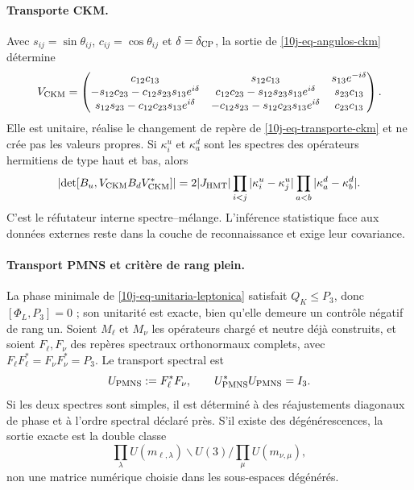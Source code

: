 \paragraph{Transporte CKM.}
Avec \(s_{ij}=\sin\theta_{ij}\), \(c_{ij}=\cos\theta_{ij}\) et \(\delta=\delta_{\rm CP}\), la sortie de \eqref{10j-eq-angulos-ckm} détermine
\begin{equation}
 V_{\rm CKM}=\begin{pmatrix}
 c_{12}c_{13}&s_{12}c_{13}&s_{13}e^{-i\delta}\\
 -s_{12}c_{23}-c_{12}s_{23}s_{13}e^{i\delta}&
 c_{12}c_{23}-s_{12}s_{23}s_{13}e^{i\delta}&s_{23}c_{13}\\
 s_{12}s_{23}-c_{12}c_{23}s_{13}e^{i\delta}&
 -c_{12}s_{23}-s_{12}c_{23}s_{13}e^{i\delta}&c_{23}c_{13}
 \end{pmatrix}.
 \label{10j-eq-vckm-explicita}
\end{equation}
Elle est unitaire, réalise le changement de repère de \eqref{10j-eq-transporte-ckm} et ne crée pas les valeurs propres. Si \(\kappa_i^u\) et \(\kappa_a^d\) sont les spectres des opérateurs hermitiens de type haut et bas, alors
\begin{equation}
 \left|\det[B_u,V_{\rm CKM}B_dV_{\rm CKM}^*]\right|
 =2|J_{\rm HMT}|
 \prod_{i<j}|\kappa_i^u-\kappa_j^u|
 \prod_{a<b}|\kappa_a^d-\kappa_b^d|.
 \label{10j-eq-determinante-conmutador-ckm}
\end{equation}
C'est le réfutateur interne spectre--mélange. L'inférence statistique face aux données externes reste dans la couche de reconnaissance et exige leur covariance.

\paragraph{Transport PMNS et critère de rang plein.}
La phase minimale de \eqref{10j-eq-unitaria-leptonica} satisfait \(Q_K\leq P_3\), donc \([\Phi_L,P_3]=0\) ; son unitarité est exacte, bien qu'elle demeure un contrôle négatif de rang un. Soient \(M_\ell\) et \(M_\nu\) les opérateurs chargé et neutre déjà construits, et soient \(F_\ell,F_\nu\) des repères spectraux orthonormaux complets, avec \(F_\ell F_\ell^*=F_\nu F_\nu^*=P_3\). Le transport spectral est
\begin{equation}
 U_{\rm PMNS}:=F_\ell^*F_\nu,
 \qquad U_{\rm PMNS}^*U_{\rm PMNS}=I_3.
 \label{10j-eq-pmns-marcos-espectrales}
\end{equation}
Si les deux spectres sont simples, il est déterminé à des réajustements diagonaux de phase et à l'ordre spectral déclaré près. S'il existe des dégénérescences, la sortie exacte est la double classe
\begin{equation}
 \prod_\lambda U(m_{\ell,\lambda})\backslash U(3)/
 \prod_\mu U(m_{\nu,\mu}),
 \label{10j-eq-pmns-clase-doble}
\end{equation}
non une matrice numérique choisie dans les sous-espaces dégénérés.

